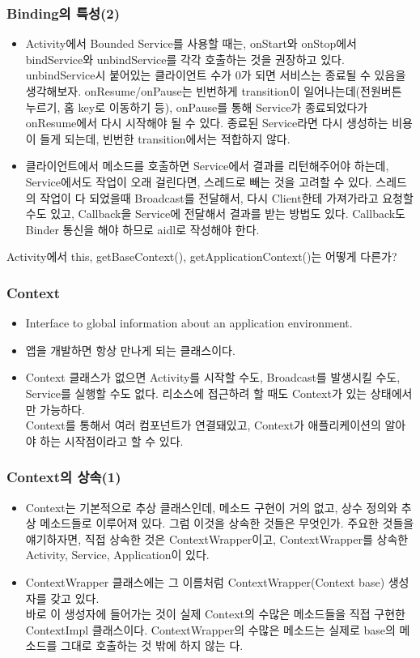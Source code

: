 \documentclass{beamer}
\begin{document}
\begin{frame}
\frametitle{Binding의 특성(2)}
\begin{itemize}
\item Activity에서 Bounded Service를 사용할 때는, onStart와 onStop에서 bindService와 unbindService를 각각 호출하는 것을 권장하고 있다. unbindService시 붙어있는 클라이언트 수가 0가 되면 서비스는 종료될 수 있음을 생각해보자. onResume/onPause는 빈번하게 transition이 일어나는데(전원버튼 누르기, 홈 key로 이동하기 등), onPause를 통해 Service가 종료되었다가 onResume에서 다시 시작해야 될 수 있다. 종료된 Service라면 다시 생성하는 비용이 들게 되는데, 빈번한 transition에서는 적합하지 않다. 
\item 클라이언트에서 메소드를 호출하면 Service에서 결과를 리턴해주어야 하는데, Service에서도 작업이 오래 걸린다면, 스레드로 빼는 것을 고려할 수 있다. 스레드의 작업이 다 되었을때 Broadcast를 전달해서, 다시 Client한테 가져가라고 요청할 수도 있고, Callback을 Service에 전달해서 결과를 받는 방법도 있다. Callback도 Binder 통신을 해야 하므로 aidl로 작성해야 한다.
\end{itemize}
\end{frame}

\begin{frame}
Activity에서 this, getBaseContext(), getApplicationContext()는 어떻게 다른가?
\end{frame}

\begin{frame}
\frametitle{Context}
\begin{itemize}
\item Interface to global information about an application environment.
\item 앱을 개발하면 항상 만나게 되는 클래스이다.
\item Context 클래스가 없으면 Activity를 시작할 수도, Broadcast를 발생시킬 수도, Service를 실행할 수도 없다. 리소스에 접근하려 할 때도 Context가 있는 상태에서만 가능하다.\\
Context를 통해서 여러 컴포넌트가 연결돼있고, Context가 애플리케이션의 알아야 하는 시작점이라고 할 수 있다.
\end{itemize}
\end{frame}

\begin{frame}
\frametitle{Context의 상속(1)}
\begin{itemize}
\item Context는 기본적으로 추상 클래스인데, 메소드 구현이 거의 없고, 상수 정의와 추상 메소드들로 이루어져 있다. 그럼 이것을 상속한 것들은 무엇인가. 주요한 것들을 얘기하자면, 직접 상속한 것은 ContextWrapper이고, ContextWrapper를 상속한 Activity, Service, Application이 있다.
\item ContextWrapper 클래스에는 그 이름처럼 ContextWrapper(Context base) 생성자를 갖고 있다.\\
바로 이 생성자에 들어가는 것이 실제 Context의 수많은 메소드들을 직접 구현한 ContextImpl 클래스이다.
ContextWrapper의 수많은 메소드는 실제로 base의 메소드를 그대로 호출하는 것 밖에 하지 않는 다.
\end{itemize}
\end{frame}
\end{document}
